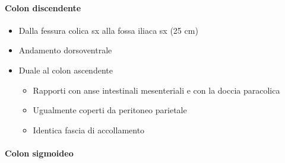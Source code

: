 \documentclass[italian,]{article}
\providecommand{\tightlist}{%
  \setlength{\itemsep}{0pt}\setlength{\parskip}{0pt}}
\begin{document}
\hypertarget{colon-discendente}{%
\paragraph{Colon discendente}\label{colon-discendente}}

\begin{itemize}
\tightlist
\item
  Dalla fessura colica sx alla fossa iliaca sx (25 cm)
\item
  Andamento dorsoventrale
\item
  Duale al colon ascendente

  \begin{itemize}
  \tightlist
  \item
    Rapporti con anse intestinali mesenteriali e con la doccia
    paracolica
  \item
    Ugualmente coperti da peritoneo parietale
  \item
    Identica fascia di accollamento
  \end{itemize}
\end{itemize}

\hypertarget{colon-sigmoideo}{%
\paragraph{Colon sigmoideo}\label{colon-sigmoideo}}
\end{document}
